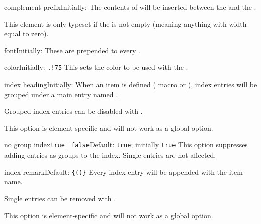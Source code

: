 \documentclass[11pt, outdir = ./out]{article}
\begin{document}
\begin{Optiondef}{complement prefix}{}{Initially: }
    The contents of  will be inserted between the  and the .

    This element is only typeset if the  is not empty (meaning anything with width equal to zero).
\end{Optiondef}

\begin{Optiondef}{font}{}{Initially: }
    These  are prepended to every .
\end{Optiondef}

\begin{Optiondef}{color}{}{Initially: \texttt{.!75}}
    This sets the color to be used with the .
\end{Optiondef}

\begin{Optiondef}{index heading}{}{Initially: }
    When an item is defined ( macro or \hyperref[environmentdef]{}), index entries will be grouped under a main entry named .

    Grouped index entries can be disabled with .

    This option is element-specific and will not work as a global option.
\end{Optiondef}

\begin{Optiondef}{no group index}{\texttt{true} | \texttt{false}}{Default: \texttt{true}; initially \texttt{true}}
    This option suppresses adding entries as groups to the index. Single entries are not affected.
\end{Optiondef}

\begin{Optiondef}{index remark}{}{Default: \texttt{\{\DocsTilde()\}}}
    Every index entry will be appended with  the item name.

    Single entries can be removed with .

    This option is element-specific and will not work as a global option.
\end{Optiondef}
\end{document}
